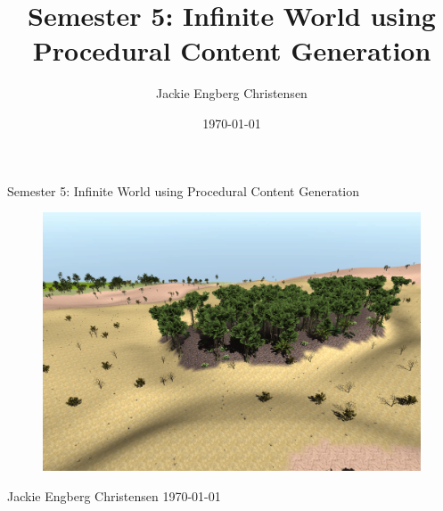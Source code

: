 \documentclass[a4paper,12pt]{report}
\title{Semester 5: Infinite World using Procedural Content Generation}
\author{Jackie Engberg Christensen}
\date{\today}
\begin{document}
\begin{titlepage}
\centering
{\LARGE Semester 5: Infinite World using Procedural Content Generation}

\begin{figure}[H]
\centering
\includegraphics[width=1\linewidth]{img/FrontPage}
\end{figure}

{\large Jackie Engberg Christensen\linebreak
\today}
\end{titlepage}

\newpage\null\thispagestyle{empty}\newpage



\newpage\null\thispagestyle{empty}\newpage
\tableofcontents












%

\newpage



\end{document}
